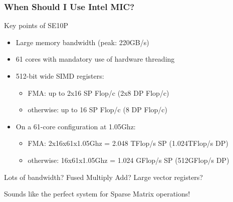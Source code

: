 \documentclass{beamer}
\newcommand{\MIC}{Intel MIC\xspace}
\begin{document}

    






\begin{frame}
  \frametitle{When Should I Use \MIC ?}

  \begin{block}{Key points of SE10P}
    \begin{itemize}
      \item Large memory bandwidth (peak: 220GB/s)
      \item 61 cores with mandatory use of hardware threading
      \item 512-bit wide SIMD registers: 
        \begin{itemize} 
          \item FMA: up to 2x16 SP Flop/c (2x8 DP Flop/c)
          \item otherwise: up to 16 SP Flop/c (8 DP Flop/c)
        \end{itemize}
      \item On a 61-core configuration at 1.05Ghz:
        \begin{itemize} 
        \item FMA: 2x16x61x1.05Ghz = 2.048 TFlop/s SP (1.024TFlop/s DP)
        \item otherwise: 16x61x1.05Ghz = 1.024 GFlop/s SP (512GFlop/s DP)
        \end{itemize}
    \end{itemize}
  \end{block}

  Lots of bandwidth? Fused Multiply Add? Large vector registers?

  Sounds like the perfect system for Sparse Matrix operations!
\end{frame}
\end{document}
